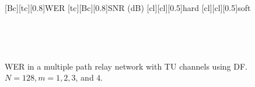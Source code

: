 \begin{figure}
    [Bc][tc][0.8]{WER}
    [tc][Bc][0.8]{SNR (dB)}
    [cl][cl][0.5]{hard}
    [cl][cl][0.5]{soft}

\centerline{
	 \\
}
\centerline{
	 \\
}
\caption{WER in a multiple path relay network with TU channels using DF.  $N = 128, m = 1, 2, 3$, and $4$.}
\label{fig:mp_df_wer_plots_TU}
\end{figure}

